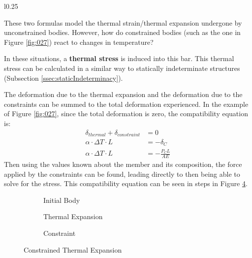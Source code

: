 \documentclass[12pt]{article}
\begin{document}
\begin{wrapfigure}[]{l}{0.25\textwidth}
  \centering
  
  \caption{Constrained Body}
  \label{fig:027}
\end{wrapfigure}

These two formulas model the thermal strain/thermal expansion undergone by unconstrained bodies. However, how do constrained bodies (such as the one in Figure \ref{fig:027}) react to changes in temperature?

In these situations, a \textbf{thermal stress} is induced into this bar. This thermal stress can be calculated in a similar way to statically indeterminate structures (Subsection \ref{ssec:staticIndeterminacy}).

The deformation due to the thermal expansion and the deformation due to the constraints can be summed to the total deformation experienced. In the example of Figure \ref{fig:027}, since the total deformation is zero, the compatibility equation is:
\begin{align*}
  \delta_{thermal} + \delta_{constraint} &= 0 \\
  \alpha \cdot \Delta T \cdot L &= - \delta_C \\
  \alpha \cdot \Delta T \cdot L &= -\frac{P_CL}{AE}
\end{align*}
Then using the values known about the member and its composition, the force applied by the constraints can be found, leading directly to then being able to solve for the stress. This compatibility equation can be seen in steps in Figure \ref{fig:constrainedThermalExpansion}.

\begin{figure}[H]
  \centering
  \begin{subfigure}[t!]{0.3\textwidth}
    \centering
    
    \caption{Initial Body}
    \label{fig:030}
  \end{subfigure}
  \begin{subfigure}[t!]{0.3\textwidth}
    \centering
    
    \caption{Thermal Expansion}
    \label{fig:031}
  \end{subfigure}
  \begin{subfigure}[t!]{0.3\textwidth}
    \centering
    
    \caption{Constraint}
    \label{fig:032}
  \end{subfigure}
  \caption{Constrained Thermal Expansion}
  \label{fig:constrainedThermalExpansion}
\end{figure}
\end{document}
